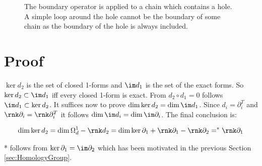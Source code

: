 \begin{appendix}
\newpage

\begin{figure}[htbp]
	\centering
 	
	\caption{The boundary operator is applied to a chain which contains a hole. A simple loop around the hole cannot be the boundary of some chain as the boundary of the hole is always included.}
	\label{fig:BoundaryOperatorVoids}
\end{figure}	

\section{Proof}
\begin{theorem}
$\ker d_2$ is the set of closed 1-forms and $\im d_1$ is the set of the exact forms. 
So $\ker d_2 \subset \im d_1$ iff every closed 1-form is exact.
From $d_2 \circ d_1 = 0$ follows $\im d_1 \subset \ker d_2$. It suffices now to prove $\dim \ker d_2 = \dim \im d_1$.
Since $d_i = \partial_i^T$ and $\rnk \partial_i = \rnk \partial_i^T$ it follows $\dim \im d_i = \dim \im \partial_i$.
The final conclusion is:

\begin{eqnarray*}
\dim \ker d_2 = \dim \Omega_d^1 - \rnk d_2 = \dim \ker \partial_1 + \rnk \partial_1 - \rnk \partial_2 =^* \rnk \partial_1
\end{eqnarray*}

* follows from $\ker \partial_1 = \im \partial_2$ which has been motivated in the previous Section \ref{sec:HomologyGroup}.
\eproof
\end{theorem}

\end{appendix}
